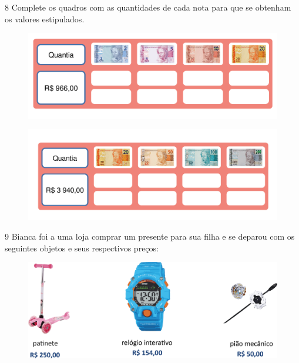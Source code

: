 
\num{8}  Complete os quadros com as quantidades de cada nota para que se
obtenham os valores estipulados. \enlargethispage{3\baselineskip}

\begin{figure}[htpb!]
\centering
\includegraphics[width=\textwidth]{./media/image69.png}
\end{figure}

\begin{figure}[htpb!]
\centering
\includegraphics[width=\textwidth]{./media/image70.png}
\end{figure}


\pagebreak
\num{9} Bianca foi a uma loja comprar um presente para sua filha e se deparou
com os seguintes objetos e seus respectivos preços:

\begin{figure}[htpb!]
\centering
\includegraphics[width=\textwidth]{./media/image72.png}
\end{figure}

